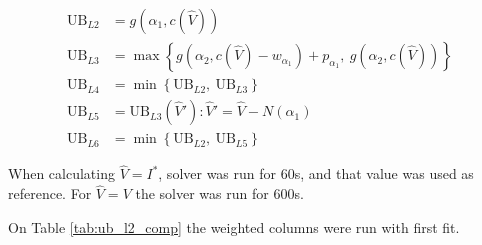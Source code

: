 \documentclass{article}
\begin{document}
\begin{align*}
\mathrm{UB}_{L2} &= g(\alpha_1, c(\hat{V})) \\
\mathrm{UB}_{L3} &= \max\left\{g(\alpha_2, c(\hat{V}) - w_{\alpha_1}) + p_{\alpha_1},\ g(\alpha_2, c(\hat{V}))\right\} \\
\mathrm{UB}_{L4} &= \min\left\{\mathrm{UB}_{L2},\ \mathrm{UB}_{L3}\right\} \\
\mathrm{UB}_{L5} &= \mathrm{UB}_{L3}(\hat{V}') : \hat{V}' = \hat{V} - N(\alpha_1) \\
\mathrm{UB}_{L6} &= \min\left\{\mathrm{UB}_{L2},\ \mathrm{UB}_{L5}\right\}
\end{align*}

When calculating $\hat{V} = I^*$, solver was run for 60s, and that value was
used as reference. For $\hat{V} = V$ the solver was run for 600s.

On Table \ref{tab:ub_l2_comp} the weighted columns were run with first fit.












\end{document}

